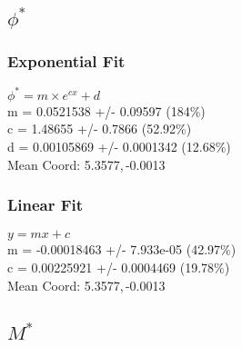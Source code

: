 \documentclass{article}
\begin{document}
	\newpage
	\subsection{$\phi^{*}$}
		\subsubsection{Exponential Fit}
			\begin{minipage}[h]{0.6\textwidth}
					\begin{center}
						\begingroup{}
			  			\resizebox{\textwidth}{!}{%
							
			  			}\endgroup
					\end{center}
			\end{minipage}
			\begin{minipage}[h]{0.35\textwidth}
				$\phi^* = m\times e^{c x} + d$ \\
				m               = 0.0521538        +/- 0.09597      (184\%)\\
				c               = 1.48655          +/- 0.7866       (52.92\%)\\
				d               = 0.00105869       +/- 0.0001342    (12.68\%)\\

				Mean Coord: 5.3577,\,-0.0013
			\end{minipage}

		\subsubsection{Linear Fit}
			\begin{minipage}[h]{0.6\textwidth}
					\begin{center}
						\begingroup{}
			  			\resizebox{\textwidth}{!}{%
							
			  			}\endgroup
					\end{center}
			\end{minipage}
			\begin{minipage}[h]{0.35\textwidth}
				$y=mx + c$ \\
				m               = -0.00018463     +/- 7.933e-05    (42.97\%) \\
				c               = 0.00225921       +/- 0.0004469    (19.78\%) \\

				Mean Coord: 5.3577,\,-0.0013
			\end{minipage}

	\newpage
	\subsection{$M^{*}$}
\end{document}
